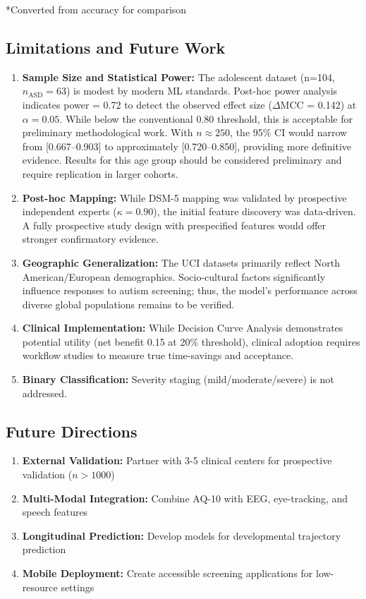 *Converted from accuracy for comparison

\subsection{Limitations and Future Work}\label{limitations-and-future-work}

\begin{enumerate}
\def\labelenumi{\arabic{enumi}.}
\tightlist
\item
  \textbf{Sample Size and Statistical Power:} The adolescent dataset (n=104, \(n_{\mathrm{ASD}}=63\)) is modest by modern ML standards. Post-hoc power analysis indicates power = 0.72 to detect the observed effect size (\(\Delta\)MCC = 0.142) at \(\alpha = 0.05\). While below the conventional 0.80 threshold, this is acceptable for preliminary methodological work. With \(n \approx 250\), the 95\% CI would narrow from {[}0.667--0.903{]} to approximately {[}0.720--0.850{]}, providing more definitive evidence. Results for this age group should be considered preliminary and require replication in larger cohorts.
\item
  \textbf{Post-hoc Mapping:} While DSM-5 mapping was validated by prospective independent experts (\(\kappa = 0.90\)), the initial feature discovery was data-driven. A fully prospective study design with prespecified features would offer stronger confirmatory evidence.
\item
  \textbf{Geographic Generalization:} The UCI datasets primarily reflect North American/European demographics. Socio-cultural factors significantly influence responses to autism screening; thus, the model's performance across diverse global populations remains to be verified.
\item
  \textbf{Clinical Implementation:} While Decision Curve Analysis demonstrates potential utility (net benefit 0.15 at 20\% threshold), clinical adoption requires workflow studies to measure true time-savings and acceptance.
\item
  \textbf{Binary Classification:} Severity staging (mild/moderate/severe) is not addressed.
\end{enumerate}

\subsection{Future Directions}\label{future-directions}

\begin{enumerate}
\def\labelenumi{\arabic{enumi}.}
\tightlist
\item
  \textbf{External Validation:} Partner with 3-5 clinical centers for prospective validation (\(n > 1000\))
\item
  \textbf{Multi-Modal Integration:} Combine AQ-10 with EEG, eye-tracking, and speech features
\item
  \textbf{Longitudinal Prediction:} Develop models for developmental trajectory prediction
\item
  \textbf{Mobile Deployment:} Create accessible screening applications for low-resource settings
\end{enumerate}

